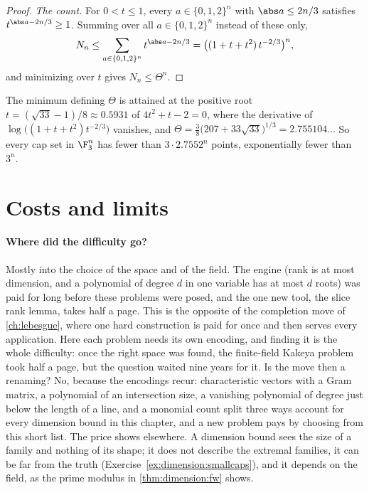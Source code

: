 \begin{refsection}
\begin{proof}
\emph{The count.} For $0<t\le1$, every $a\in\{0,1,2\}^n$ with $\abs a\le2n/3$ satisfies $t^{\abs a-2n/3}\ge1$. Summing over all $a\in\{0,1,2\}^n$ instead of these only,
\[
N_n\le\sum_{a\in\{0,1,2\}^n}t^{\abs a-2n/3}=\big((1+t+t^2)\,t^{-2/3}\big)^n,
\]
and minimizing over $t$ gives $N_n\le\Theta^n$.
\end{proof}

The minimum defining $\Theta$ is attained at the positive root $t=(\sqrt{33}-1)/8\approx0.5931$ of $4t^2+t-2=0$, where the derivative of $\log\big((1+t+t^2)t^{-2/3}\big)$ vanishes, and $\Theta=\tfrac38\big(207+33\sqrt{33}\big)^{1/3}=2.755104\ldots$ So every cap set in $\F_3^n$ has fewer than $3\cdot2.7552^n$ points, exponentially fewer than $3^n$.

\section{Costs and limits}\label{sec:dimension:costs}

\paragraph{Where did the difficulty go?}
Mostly into the choice of the space and of the field. The engine (rank is at most dimension, and a polynomial of degree $d$ in one variable has at most $d$ roots) was paid for long before these problems were posed, and the one new tool, the slice rank lemma, takes half a page. This is the opposite of the completion move of \cref{ch:lebesgue}, where one hard construction is paid for once and then serves every application. Here each problem needs its own encoding, and finding it is the whole difficulty: once the right space was found, the finite-field Kakeya problem took half a page, but the question waited nine years for it. Is the move then a renaming? No, because the encodings recur: characteristic vectors with a Gram matrix, a polynomial of an intersection size, a vanishing polynomial of degree just below the length of a line, and a monomial count split three ways account for every dimension bound in this chapter, and a new problem pays by choosing from this short list. The price shows elsewhere. A dimension bound sees the size of a family and nothing of its shape; it does not describe the extremal families, it can be far from the truth (Exercise~\ref{ex:dimension:smallcaps}), and it depends on the field, as the prime modulus in \cref{thm:dimension:fw} shows.


\end{refsection}
